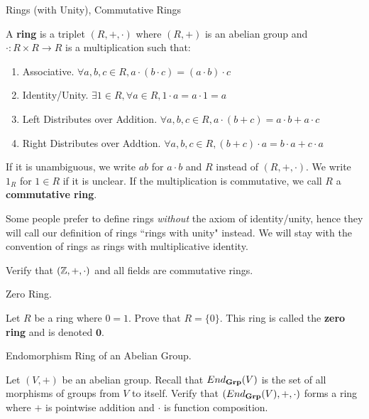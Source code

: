 \documentclass[../book.tex]{subfiles}
\begin{document}
\begin{dfn} Rings (with Unity), Commutative Rings
    
    A \textbf{ring} is a triplet $(R,+,\cdot)$ where
    $(R,+)$ is an abelian group and 
    $\cdot : R \times R \to R$ is a multiplication such that:
    \begin{enumerate}
        \item Associative. 
        $\forall a, b, c \in R, a \cdot (b \cdot c) = (a \cdot b) \cdot c$
        \item Identity/Unity. 
        $\exists 1 \in R, \forall a \in R, 1 \cdot a = a \cdot 1 = a$
        \item Left Distributes over Addition. 
        $\forall a, b, c \in R, a\cdot(b + c) = a\cdot b + a\cdot c$
        \item Right Distributes over Addtion.
        $\forall a, b, c \in R, (b + c)\cdot a = b\cdot a + c\cdot a$
    \end{enumerate}
    If it is unambiguous, we write $ab$ for $a\cdot b$ and
    $R$ instead of $(R,+,\cdot)$. 
    We write $1_R$ for $1 \in R$ if it is unclear. 
    If the multiplication is commutative, we call $R$ a \textbf{commutative ring}.
    
    Some people prefer to define rings \emph{without} the axiom of identity/unity,
    hence they will call our definition of rings ``rings with unity" instead. 
    We will stay with the convention of rings as rings with multiplicative identity.
    
\end{dfn}

\begin{ex}
    Verify that $(\mathbb{Z},+,\cdot)$ and all fields are commutative rings. 
\end{ex}

\begin{ex} Zero Ring.
    
    Let $R$ be a ring where $0 = 1$. Prove that $R = \{0\}$.
    This ring is called the \textbf{zero ring} and is denoted $\textbf{0}$.
\end{ex}

\begin{ex} Endomorphism Ring of an Abelian Group. 

    Let $(V,+)$ be an abelian group. 
    Recall that $End_{\mathbf{Grp}}(V)$ is 
    the set of all morphisms of groups from $V$ to itself.
    Verify that $(End_{\mathbf{Grp}}(V),+,\cdot)$ forms a ring where
    $+$ is pointwise addition and $\cdot$ is function composition. 
    
\end{ex}
\end{document}
